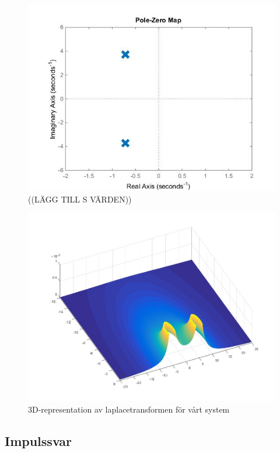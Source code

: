\documentclass[10pt,a4paper]{article}
\begin{document}
\begin{figure}[h]
\begin{center}
\includegraphics[scale=0.4]{nolpol-diagram}
\caption{((LÄGG TILL S VÄRDEN))}
\end{center}
\end{figure}
\begin{figure}[h]
\begin{center}
\includegraphics[scale=0.25]{3Dpoler4}
\caption{3D-representation av laplacetransformen för vårt system}
\end{center}
\end{figure}

\newpage


\subsection{Impulssvar}
\end{document}
